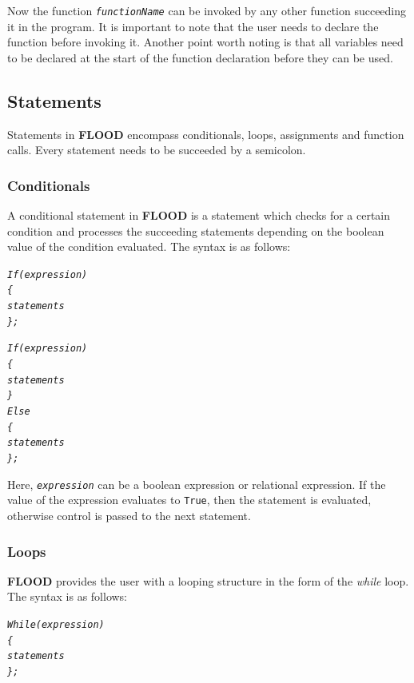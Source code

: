 \documentclass[12pt]{report}
\begin{document}
Now the function \texttt{\textit{functionName}} can be invoked by any other function succeeding it in the program. It is important to note that the user needs to declare the function before invoking it.
Another point worth noting is that all variables need to be declared at the start of the function declaration before they can be used. 

\subsection{Statements}

Statements in \textbf{FLOOD} encompass conditionals, loops, assignments and function calls. Every statement needs to be succeeded by a semicolon.

\subsubsection{Conditionals}

A conditional statement in \textbf{FLOOD} is a statement which checks for a certain condition and processes the succeeding statements depending on the boolean value of the condition evaluated. The syntax is as follows:

\begin{alltt}\begin{singlespace}
            \textit{If (expression)
            \{
                statements
            \};}


            \textit{If (expression)
            \{
                statements
            \}
            Else
            \{
                statements
            \};}\end{singlespace}
\end{alltt}

Here, \textit{\texttt{expression}} can be a boolean expression or relational expression. If the value of the expression evaluates to \texttt{True}, then the statement is evaluated, otherwise control is passed to the next statement.

\subsubsection{Loops}

\textbf{FLOOD} provides the user with a looping structure in the form of the \textit{while} loop. The syntax is as follows:

\begin{alltt}\begin{singlespace}
            \textit{While (expression)
            \{
                statements
            \};}\end{singlespace}
\end{alltt}
\end{document}
